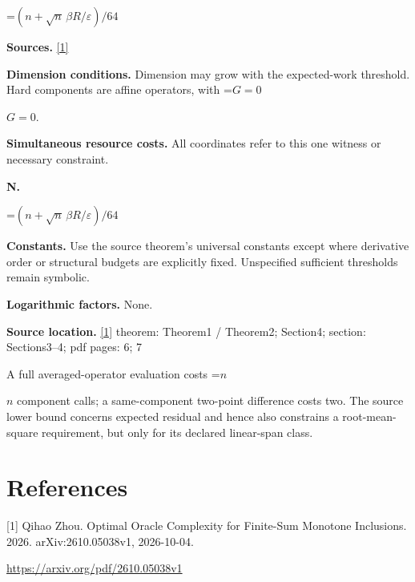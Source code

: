 \documentclass[10pt,a4paper]{article}
\newcommand{\AtlasMath}[1]{\par\begingroup\centering\setbox0=\hbox{$\displaystyle #1$}\ifdim\wd0>1.4\linewidth\typeout{ATLAS WIDE FORMULA: \the\wd0}\fi\ifdim\wd0>\linewidth\resizebox{\linewidth}{!}{\box0}\else\box0\fi\par\endgroup}
\newcommand{\AtlasInlineMath}[1]{\begingroup\setbox0=\hbox{$#1$}\ifdim\wd0>.4\linewidth\endgroup\AtlasMath{#1}\else\endgroup$#1$\fi}
\begin{document}
\AtlasMath{(n+\sqrt n\,\beta R/\varepsilon)/64}
\textbf{Sources.} \href{https://arxiv.org/pdf/2610.05038v1}{[1]}

\textbf{Dimension conditions.} Dimension may grow with the expected-work threshold. Hard components are affine operators, with \AtlasInlineMath{G=0}.

\textbf{Simultaneous resource costs.} All coordinates refer to this one witness or necessary constraint.

\textbf{N.}

\AtlasMath{(n+\sqrt n\,\beta R/\varepsilon)/64}
\textbf{Constants.} Use the source theorem’s universal constants except where derivative order or structural budgets are explicitly fixed. Unspecified sufficient thresholds remain symbolic.

\textbf{Logarithmic factors.} None.

\textbf{Source location.} \href{https://arxiv.org/pdf/2610.05038v1}{[1]} theorem: Theorem1 / Theorem2; Section4; section: Sections3--4; pdf pages: 6; 7

A full averaged-operator evaluation costs \AtlasInlineMath{n} component calls; a same-component two-point difference costs two. The source lower bound concerns expected residual and hence also constrains a root-mean-square requirement, but only for its declared linear-span class.

\section{References}
[1] Qihao Zhou. Optimal Oracle Complexity for Finite-Sum Monotone Inclusions. 2026. arXiv:2610.05038v1, 2026-10-04.

\url{https://arxiv.org/pdf/2610.05038v1}
\end{document}
